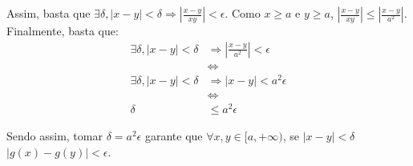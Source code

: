 Assim, basta que $\exists \delta, |x-y| < \delta \Rightarrow |\frac{x-y}{xy}| < \epsilon$. Como $x \ge a$ e $y \ge a$, \entao $|\frac{x-y}{xy}| \le |\frac{x-y}{a^2}|$. Finalmente, basta que:
\begin{align*}
	\exists \delta, |x-y| < \delta &\Rightarrow |\frac{x-y}{a^2}| < \epsilon \\
	&\iff \\
	\exists \delta, |x-y| < \delta &\Rightarrow |x-y| < a^2\epsilon \\
	&\iff \\
	\delta &\le a^2\epsilon
\end{align*}

Sendo assim, tomar $\delta = a^2\epsilon$ garante que $\forall x,y \in [a, +\infty)$, se $|x-y|<\delta$ \entao $|g(x) - g(y)| < \epsilon$.























